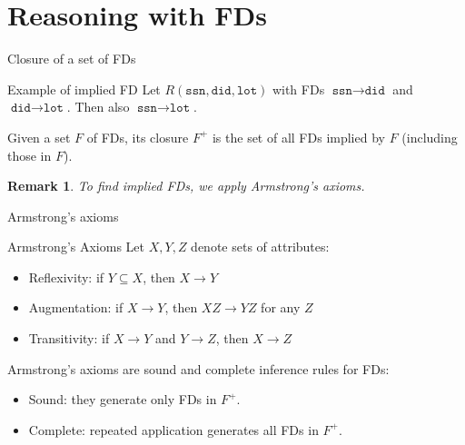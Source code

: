 \documentclass[10pt,aspectratio=169]{beamer}
\newtheorem{remark}{Remark}
\newenvironment{examplebox}[1][Example]{\begin{exampleblock}{#1}}{\end{exampleblock}}
\begin{document}

\section{Reasoning with FDs}

\begin{frame}{Closure of a set of FDs}
\begin{examplebox}[Example of implied FD]
Let \(R(\texttt{ssn},\texttt{did},\texttt{lot})\) with FDs
\(\texttt{ssn}\rightarrow\texttt{did}\) and \(\texttt{did}\rightarrow\texttt{lot}\).
Then also \(\texttt{ssn}\rightarrow\texttt{lot}\).
\end{examplebox}

\begin{definition}[Closure \(F^+\)]
Given a set \(F\) of FDs, its closure \(F^+\) is the set of all FDs implied by \(F\) (including those in \(F\)).
\end{definition}

\begin{remark}
To find implied FDs, we apply Armstrong's axioms.
\end{remark}
\end{frame}

\begin{frame}{Armstrong's axioms}
\begin{block}{Armstrong’s Axioms}
Let \(X,Y,Z\) denote sets of attributes:
\begin{itemize}
  \item Reflexivity: if \(Y \subseteq X\), then \(X \rightarrow Y\)
  \item Augmentation: if \(X \rightarrow Y\), then \(XZ \rightarrow YZ\) for any \(Z\)
  \item Transitivity: if \(X \rightarrow Y\) and \(Y \rightarrow Z\), then \(X \rightarrow Z\)
\end{itemize}
\end{block}

\begin{theorem}
Armstrong's axioms are sound and complete inference rules for FDs:
\begin{itemize}
  \item Sound: they generate only FDs in \(F^+\).
  \item Complete: repeated application generates all FDs in \(F^+\).
\end{itemize}
\end{theorem}
\end{frame}
\end{document}
